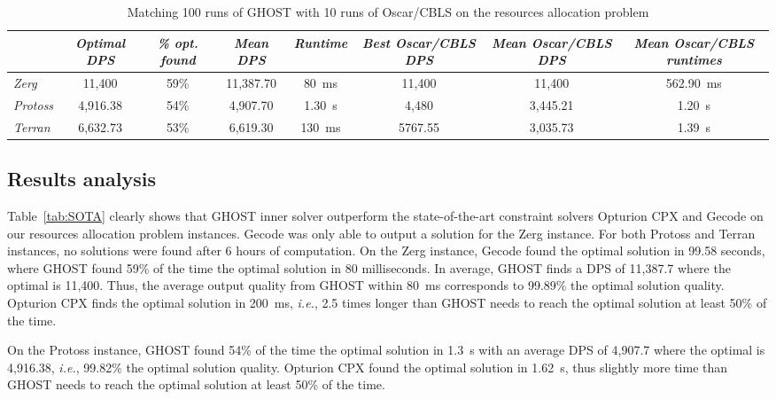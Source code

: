 \documentclass[journal]{IEEEtran}
\newcommand{\ghost}{\textsc{GHOST}\xspace}
\newcommand{\ie}{\textit{i.e.}}
\begin{document}
\begin{table}[ht]
  \caption{Matching 100 runs of \ghost with 10 runs of Oscar/CBLS on the resources allocation problem}
    \label{tab:oscar}
    \centering
    \begin{tabular}{|l|c|c|c|c|c|c|c|}
      \cline{2-8}
      \multicolumn{1}{c|}{} & {\em Optimal DPS}& {\em \% opt. found}
      & {\em Mean DPS}& {\em Runtime}
      & {\em Best Oscar/CBLS DPS}& {\em Mean Oscar/CBLS DPS}
      & {\em Mean Oscar/CBLS runtimes} \\
      \hline
      {\em Zerg} & 11,400 & 59\% & 11,387.70 & 80~ms & 11,400 & 11,400 &
      562.90~ms\\
      {\em Protoss}  & 4,916.38  & 54\%  & 4,907.70 &  1.30~s &  4,480 &
      3,445.21 & 1.20~s\\
      {\em Terran}  & 6,632.73 & 53\%  & 6,619.30 & 130~ms  & 5767.55 &
      3,035.73 & 1.39~s \\
      \hline
    \end{tabular}
\end{table}

\subsection{Results analysis}

Table~\ref{tab:SOTA} clearly shows that \ghost inner solver outperform
the state-of-the-art constraint solvers Opturion CPX and Gecode on our
resources allocation problem instances. Gecode was only able to output
a  solution  for  the  Zerg  instance. For  both  Protoss  and  Terran
instances, no  solutions were found  after 6 hours of  computation. On
the Zerg instance, Gecode found the optimal solution in 99.58 seconds,
where  \ghost found  59\%  of  the time  the  optimal  solution in  80
milliseconds.  In  average, \ghost  finds a DPS  of 11,387.7  where the
optimal is 11,400. Thus, the average output quality from \ghost within
80~ms corresponds to 99.89\% the optimal solution quality. Opturion CPX
finds  the optimal  solution  in  200~ms, \ie,  2.5  times longer than  \ghost
needs to reach the optimal solution at least 50\% of the time.

On the  Protoss instance, \ghost  found 54\%  of the time  the optimal
solution  in 1.3~s with  an average  DPS of  4,907.7 where  the
optimal   is    4,916.38,   \ie,   99.82\%   the    optimal   solution
quality.  Opturion  CPX  found  the optimal  solution  in  1.62~s,  thus
slightly more time  than \ghost needs to reach the  optimal solution at
least 50\% of the time.
\end{document}
